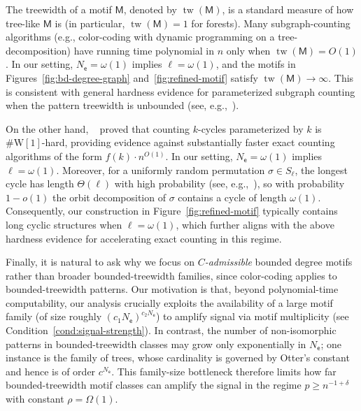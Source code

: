 \documentclass[letterpaper,11pt]{article}
\theoremstyle{definition}
\newcommand{\sfM}{{\mathsf{M}}}
\newcommand{\sfe}{{\mathsf{e}}}
\begin{document}
The treewidth of a motif $\sfM$, denoted by $\operatorname{tw}(\sfM)$, is a standard measure of how tree-like $\sfM$ is (in particular, $\operatorname{tw}(\sfM)=1$ for forests). 
Many subgraph-counting algorithms (e.g., color-coding with dynamic programming on a tree-decomposition) have running time polynomial in $n$ only when $\operatorname{tw}(\sfM)=O(1)$. In our setting, $N_{\sfe}=\omega(1)$ implies $\ell=\omega(1)$, and the motifs in Figures~\ref{fig:bd-degree-graph} and~\ref{fig:refined-motif} satisfy $\operatorname{tw}(\sfM)\to\infty$. This is consistent with general hardness evidence for parameterized subgraph counting when the pattern treewidth is unbounded (see, e.g.,~\cite{meeks2016challenges}).

On the other hand, ~\cite{flum2004parameterized} proved that counting $k$-cycles parameterized by $k$ is $\#\mathrm{W}[1]$-hard, providing evidence against substantially faster exact counting algorithms of the form $f(k)\cdot n^{O(1)}$. In our setting, $N_{\sfe}=\omega(1)$ implies $\ell=\omega(1)$. Moreover, for a uniformly random permutation $\sigma\in S_\ell$, the longest cycle has length $\Theta(\ell)$ with high probability (see, e.g.,~\cite{shepp1966ordered}), so with probability $1-o(1)$ the orbit decomposition of $\sigma$ contains a cycle of length $\omega(1)$. Consequently, our construction in Figure~\ref{fig:refined-motif} typically contains long cyclic structures when $\ell=\omega(1)$, which further aligns with the above hardness evidence for accelerating exact counting in this regime.

Finally, it is natural to ask why we focus on \emph{$C$-admissible} bounded degree motifs rather than broader bounded-treewidth families, since color-coding applies to bounded-treewidth patterns. Our motivation is that, beyond polynomial-time computability, our analysis crucially exploits the availability of a large motif family (of size roughly $(c_1N_{\sfe})^{c_2N_{\sfe}}$) to amplify signal via motif multiplicity (see Condition~\ref{cond:signal-strength}). In contrast, the number of non-isomorphic patterns in bounded-treewidth classes may grow only exponentially in $N_{\sfe}$; one instance is the family of trees, whose cardinality is governed by Otter's constant~\cite{otter1948number} and hence is of order $c^{N_{\sfe}}$. 
This family-size bottleneck therefore limits how far bounded-treewidth motif classes can amplify the signal in the regime $p\ge n^{-1+\delta}$ with constant $\rho=\Omega(1)$.
\end{document}

